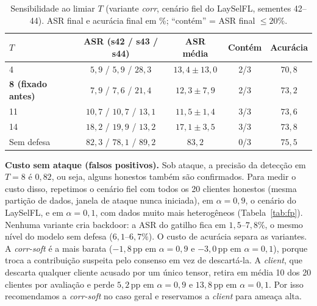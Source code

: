 \begin{table}[t]\centering\small
\caption{Sensibilidade ao limiar $T$ (variante \emph{corr}, cenário fiel do LaySelFL, sementes 42--44).
ASR final e acurácia final em \%; ``contém'' = ASR final $\leq 20\%$.}
\label{tab:sensT}
\begin{tabular}{lcccc}
\toprule
$T$ & ASR (s42 / s43 / s44) & ASR média & Contém & Acurácia \\
\midrule
4 & $5{,}9$ / $5{,}9$ / $28{,}3$ & $13{,}4\pm13{,}0$ & 2/3 & $70{,}8$ \\
\textbf{8 (fixado antes)} & $7{,}9$ / $7{,}6$ / $21{,}4$ & $12{,}3\pm7{,}9$ & 2/3 & $73{,}2$ \\
11 & $10{,}7$ / $10{,}7$ / $13{,}1$ & $11{,}5\pm1{,}4$ & 3/3 & $73{,}6$ \\
14 & $18{,}2$ / $19{,}9$ / $13{,}2$ & $17{,}1\pm3{,}5$ & 3/3 & $73{,}8$ \\
Sem defesa & $82{,}3$ / $78{,}1$ / $89{,}2$ & $83{,}2$ & 0/3 & $75{,}5$ \\
\bottomrule
\end{tabular}
\end{table}

\textbf{Custo sem ataque (falsos positivos).} Sob ataque, a precisão da detecção em $T{=}8$ é
$0{,}82$, ou seja, alguns honestos também são confirmados. Para medir o custo disso, repetimos o
cenário fiel com todos os 20 clientes honestos (mesma partição de dados, janela de ataque nunca
iniciada), em $\alpha{=}0{,}9$, o cenário do LaySelFL, e em $\alpha{=}0{,}1$, com dados muito mais
heterogêneos (Tabela~\ref{tab:fp}). Nenhuma variante cria backdoor: a ASR do gatilho fica em
$1{,}5$--$7{,}8\%$, o mesmo nível do modelo sem defesa ($6{,}1$--$6{,}7\%$). O custo de acurácia
separa as variantes. A \emph{corr-soft} é a mais barata ($-1{,}8$\,pp em $\alpha{=}0{,}9$ e $-3{,}0$\,pp
em $\alpha{=}0{,}1$), porque troca a contribuição suspeita pelo consenso em vez de descartá-la. A
\emph{client}, que descarta qualquer cliente acusado por um único tensor, retira em média 10 dos 20
clientes por avaliação e perde $5{,}2$\,pp em $\alpha{=}0{,}9$ e $13{,}8$\,pp em $\alpha{=}0{,}1$. Por
isso recomendamos a \emph{corr-soft} no caso geral e reservamos a \emph{client} para ameaça alta.

